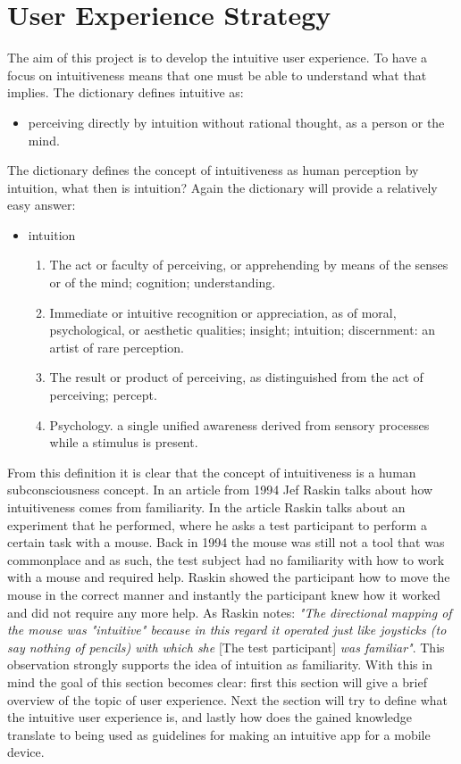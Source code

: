 \section{User Experience Strategy}
\label{UserExperiene}
The aim of this project is to develop the intuitive user experience. To have a focus on intuitiveness means that one must be able to understand what that 
implies. The dictionary defines intuitive as: 
\begin{itemize}
\item perceiving directly by intuition without rational thought, as a person or the mind.
\end{itemize}
The dictionary defines the concept of intuitiveness as human perception by intuition, what then is intuition? Again the dictionary will provide a relatively easy answer: 
\begin{itemize}
\item intuition\\
\begin{enumerate}
\item The act or faculty of perceiving, or apprehending by means of the senses or 
of the mind; cognition; understanding.
\item Immediate or intuitive recognition or appreciation, as of moral, 
psychological, or aesthetic qualities; insight; intuition; discernment:
an artist of rare perception.
\item The result or product of perceiving, as distinguished from the act of 
perceiving; percept.
\item Psychology. a single unified awareness derived from sensory processes while 
a stimulus is present.
\end{enumerate}
\end{itemize} From this definition it is clear that the concept of intuitiveness is a human subconsciousness concept. In an article from 1994 Jef Raskin\cite{JRaskin} talks about how intuitiveness comes from familiarity. 
In the article Raskin talks about an experiment that he performed, where he asks a test participant to perform a certain task with a mouse. Back in 1994 the mouse was still not a tool that was commonplace and as such, the test subject had no familiarity with how to work with a mouse and required help. Raskin showed the participant how to move the mouse in the correct manner and instantly the participant knew how it worked and did not require any more help. As Raskin notes: \textit{"The directional mapping of the mouse was "intuitive" because in this regard it operated just like joysticks (to say nothing of pencils) with which she} [The test participant] \textit{was familiar"}.
\cite{JRaskin} This observation strongly supports the idea of intuition as familiarity. With this in mind the goal of this section becomes clear: first this section will give a brief overview of the topic of user experience. Next the section will try to define what the intuitive user experience is, and lastly how 
does the gained knowledge translate to being used as guidelines for making an intuitive app for a mobile device.  

